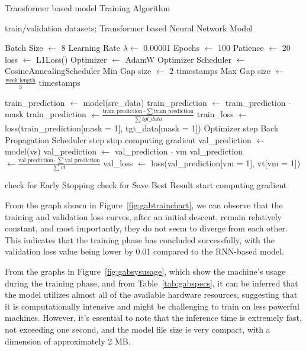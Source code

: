 \begin{algorithm}[H]
	\caption{Transformer based model Training Algorithm}\label{alg:gabtraining}
	\begin{algorithmic}
		\Require train/validation datasets; Transformer based Neural Network Model

		\State Batch Size $\gets$ 8
		\State Learning Rate $\lambda \gets$ 0.00001
		\State Epochs $\gets$ 100
		\State Patience $\gets$ 20
		\State loss $\gets$ L1Loss()
		\State Optimizer $\gets$ AdamW Optimizer
		\State Scheduler $\gets$ CosineAnnealingScheduler
		\State Min Gap size $\gets$ 2 timestamps
		\State Max Gap size $\gets$ $\frac{\text{week length}}{3}$ timestamps
		\State

		\State train\_prediction $\gets$ model(src\_data) 
		\State train\_prediction $\gets$ train\_prediction $\cdot$ mask
		\State train\_prediction $\gets \frac{\text{train\_prediction} \cdot \sum\text{train\_prediction}}{\sum tgt\_data}$ 
		\State train\_loss $\gets$ loss(train\_prediction[mask = 1], tgt\_data[mask = 1])
		\State Optimizer step
		\State Back Propagation
		\EndFor
		\State Scheduler step
		\State stop computing gradient
		\State val\_prediction $\gets$ model(vs) 
		\State val\_prediction $\gets$ val\_prediction $\cdot$ vm
		\State val\_prediction $\gets \frac{\text{val\_prediction} \cdot \sum\text{val\_prediction}}{\sum vt}$ 
		\State val\_loss $\gets$ loss(val\_prediction[vm = 1], vt[vm = 1])
		\EndFor

		\State check for Early Stopping
		\State check for Save Best Result
		\State start computing gradient
		\EndFor
	\end{algorithmic}
\end{algorithm}
\newpage
From the graph shown in Figure~\ref{fig:gabtrainchart}, we can observe that the training and validation loss curves, after an initial descent, remain relatively constant, and most importantly, they do not seem to diverge from each other. This indicates that the training phase has concluded successfully, with the validation loss value being lower by 0.01 compared to the RNN-based model.

From the graphs in Figure~\ref{fig:gabsysusage}, which show the machine's usage during the training phase, and from Table~\ref{tab:gabspecs}, it can be inferred that the model utilizes almost all of the available hardware resources, suggesting that it is computationally intensive and might be challenging to train on less powerful machines. However, it's essential to note that the inference time is extremely fast, not exceeding one second, and the model file size is very compact, with a dimension of approximately 2 MB.

